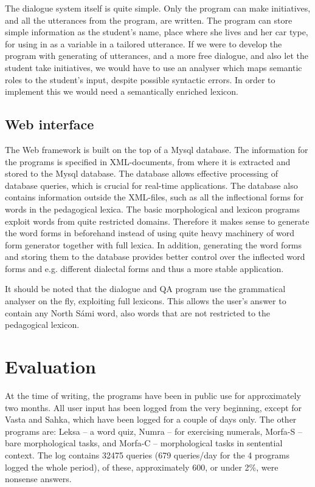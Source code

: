 \documentclass[11pt]{article}
\begin{document}
The dialogue system itself is quite simple. Only the program can make initiatives, and all the utterances from the program, are written. The program can store simple information as the student's name, place where she lives and her car type, for using in as a variable in a tailored utterance. If we were to develop the program with generating of utterances, and a more free dialogue, and also let the student take initiatives, we would have to use an analyser which maps semantic roles to the student's input, despite possible syntactic errors. In order to implement this we would need a semantically enriched lexicon.

\subsection{Web interface}

The Web framework is built on the top of a Mysql database. The information for the programs is specified in XML-documents, from where it is extracted and stored to the Mysql database. The database allows effective processing of database queries, which is crucial for real-time applications. The database also contains information outside the XML-files, such as all the inflectional forms for words in the pedagogical lexica. The basic morphological and lexicon programs exploit words from quite restricted domains. Therefore it makes sense to generate the word forms in beforehand instead of using quite heavy machinery of word form generator together with full lexica. In addition, generating the word forms and storing them to the database provides better control over the inflected word forms and e.g. different dialectal forms and thus a more stable application.

It should be noted that the dialogue and QA program use the grammatical analyser on the fly, exploiting full lexicons. This allows the user's answer to contain any North Sámi word, also words that are not restricted to the pedagogical lexicon.

\section{Evaluation}

At the time of writing, the programs have been in public use for approximately two months. %
All user input has been logged from the very beginning, except for Vasta and Sahka, which have been logged for a couple of days only. The other programs are: Leksa -- a word quiz, Numra -- for exercising numerals, Morfa-S -- bare morphological tasks, and Morfa-C -- morphological tasks in sentential context. The log contains 32475 queries (679 queries/day for the 4 programs logged the whole period), of these, approximately 600, or under 2\%, were nonsense answers. %
\end{document}
